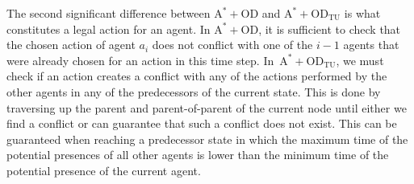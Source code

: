 \documentclass[jair,twoside,11pt,theapa]{article}
\newcommand{\oda}{$\mathrm{A^{*}+OD}$\xspace}
\newcommand{\odatu}{$\mathrm{A^{*}+OD_{TU}}$\xspace}
\begin{document}
The second significant difference between \oda and \odatu is what constitutes a legal action for an agent. 
In \oda, it is sufficient to check that the chosen action of agent $a_i$ does not conflict with one of the $i-1$ agents that were already chosen for an action in this time step. 
In~\odatu, we must check if an action creates a conflict with any of the actions performed by the other agents in any of the predecessors of the current state. 
This is done by traversing up the parent and parent-of-parent of the current node until either we find a conflict or can guarantee that such a conflict does not exist. This can be guaranteed when reaching a predecessor state in which the maximum time of the potential presences of all other agents is lower than the minimum time of the potential presence of the current agent. 













\end{document}
